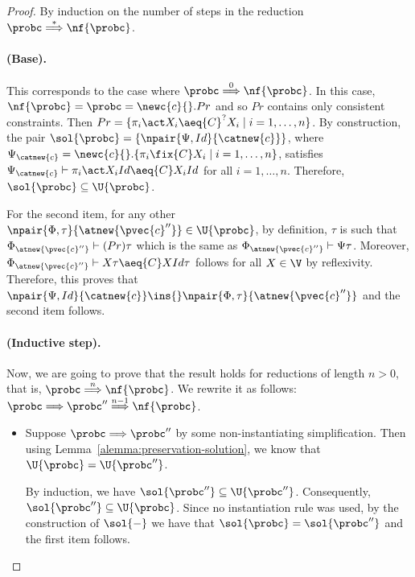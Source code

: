 \correctness*

\begin{proof}
  By induction on the number of steps in the reduction $\probc \overset{*}{\Longrightarrow} \nf{\probc}$.

       \paragraph{(Base).}  This corresponds to the case where $\probc\overset{0}{\Longrightarrow} \nf{\probc}$. In this case, $\nf{\probc} = \probc = \newc{c}{}.Pr$ and so $Pr$ contains only consistent constraints. Then $Pr = \{\pi_i\act X_i\aeq{C}^? X_i \mid i=1,\ldots,n\}$. By construction, the pair $\sol{\probc} = \{\npair{\Psi,Id}{\catnew{c}}\}$, where $\Psi_{\catnew{c}} = \newc{c}{}. \{\pi_i\fix{C} X_i \mid i=1,\ldots,n\}$, satisfies $\Psi_{\catnew{c}} \vdash \pi_i\act X_iId \aeq{C} X_iId$  for all $i=1,\ldots,n$. Therefore, $\sol{\probc} \subseteq \U{\probc}$.

           For the second item, for any other $\npair{\Phi,\tau}{\atnew{\pvec{c}''}} \in \U{\probc}$, by definition, $\tau$ is such that $\Phi_{\atnew{\pvec{c}''}} \vdash (Pr)\tau$ which is the same as $\Phi_{\atnew{\pvec{c}''}} \vdash \Psi\tau$. Moreover,  $\Phi_{\atnew{\pvec{c}''}} \vdash X\tau \aeq{C} XId\tau$ follows for all $X\in \V$ by reflexivity. Therefore, this proves that $\npair{\Psi,Id}{\catnew{c}} \ins{} \npair{\Phi,\tau}{\atnew{\pvec{c}''}}$ and the second item follows.

        \paragraph*{(Inductive step).}  Now, we are going to prove that the result holds for reductions of length $n>0$, that is, $\probc\overset{n}{\Longrightarrow} \nf{\probc}$. We rewrite it as follows: $\probc \Longrightarrow \probc''\overset{n-1}{\Longrightarrow} \nf{\probc}$.

           \begin{itemize}
                \item Suppose $\probc \Longrightarrow \probc''$ by some non-instantiating simplification. Then using Lemma~\ref{alemma:preservation-solution}, we know that $\U{\probc} = \U{\probc''}$.

                By induction, we have $\sol{\probc''} \subseteq \U{\probc''}$. Consequently, $\sol{\probc''} \subseteq \U{\probc}$. Since no instantiation rule was used, by the construction of $\sol{-}$ we have that $\sol{\probc} = \sol{\probc''}$ and the first item follows.


\end{itemize}
\end{proof}

